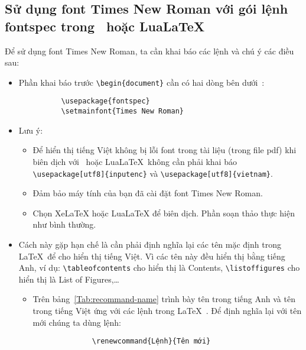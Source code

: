 \documentclass[12pt,a4paper]{article}
\begin{document}
\subsection{Sử dụng font Times New Roman với gói lệnh fontspec trong \XeLaTeX\ hoặc Lua\LaTeX}
Để sử dụng font Times New Roman, ta cần khai báo các lệnh và chú ý các điều sau:
\begin{itemize}
  \item Phần khai báo trước \verb|\begin{document}| cần có hai dòng bên dưới~\cite{fontspec-chandrahas, fontspec-stackexchange}:
        \begin{verbatim}
          \usepackage{fontspec}
          \setmainfont{Times New Roman}
        \end{verbatim}

  \item Lưu ý:
        \begin{itemize}
          \item Để hiển thị tiếng Việt không bị lỗi font trong tài liệu (trong file pdf) khi biên dịch với \XeLaTeX\ hoặc Lua\LaTeX\ không cần phải khai báo \verb|\usepackage[utf8]{inputenc}| và \verb|\usepackage[utf8]{vietnam}|.

          \item Đảm bảo máy tính của bạn đã cài đặt font Times New Roman.

          \item Chọn XeLaTeX hoặc LuaLaTeX để biên dịch. Phần soạn thảo thực hiện như bình thường.
        \end{itemize}

  \item Cách này gặp hạn chế là cần phải định nghĩa lại các tên mặc định trong \LaTeX\ để cho hiển thị tiếng Việt. Vì các tên này đều hiển thị bằng tiếng Anh, ví dụ: \verb|\tableofcontents| cho hiển thị là Contents, \verb|\listoffigures| cho hiển thị là List of Figures,\ldots
        \begin{itemize}
          \item Trên bảng~\ref{Tab:recommand-name} trình bày tên trong tiếng Anh và tên trong tiếng Việt ứng với các lệnh trong \LaTeX~\cite{nguyenhuudien}. Để định nghĩa lại với tên mới chúng ta dùng lệnh:
                \begin{verbatim}
              \renewcommand{Lệnh}{Tên mới}
            \end{verbatim}


\end{itemize}
\end{itemize}
\end{document}
